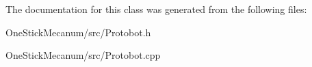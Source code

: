 The documentation for this class was generated from the following files\+:\begin{DoxyCompactItemize}
\item 
One\+Stick\+Mecanum/src/Protobot.\+h\item 
One\+Stick\+Mecanum/src/Protobot.\+cpp\end{DoxyCompactItemize}
